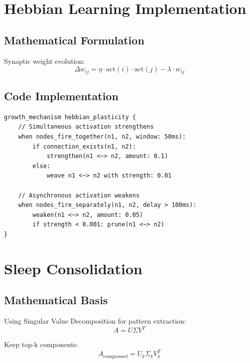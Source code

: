 \documentclass[12pt,a4paper,openany]{book} %
\begin{document}
\section{Hebbian Learning Implementation}

\subsection{Mathematical Formulation}

Synaptic weight evolution:
\begin{equation}
\Delta w_{ij} = \eta \cdot \text{act}(i) \cdot \text{act}(j) - \lambda \cdot w_{ij}
\end{equation}

\subsection{Code Implementation}

\vspace{0.5em}
\begin{lstlisting}[language=loom]
growth_mechanism hebbian_plasticity {
    // Simultaneous activation strengthens
    when nodes_fire_together(n1, n2, window: 50ms):
        if connection_exists(n1, n2):
            strengthen(n1 <~> n2, amount: 0.1)
        else:
            weave n1 <~> n2 with strength: 0.01

    // Asynchronous activation weakens
    when nodes_fire_separately(n1, n2, delay > 100ms):
        weaken(n1 <~> n2, amount: 0.05)
        if strength < 0.001: prune(n1 <~> n2)
}
\end{lstlisting}
\vspace{0.5em}

\section{Sleep Consolidation}

\subsection{Mathematical Basis}

Using Singular Value Decomposition for pattern extraction:
\begin{equation}
A = U\Sigma V^T
\end{equation}

Keep top-k components:
\begin{equation}
A_{\text{compressed}} = U_k \Sigma_k V_k^T
\end{equation}
\end{document}

